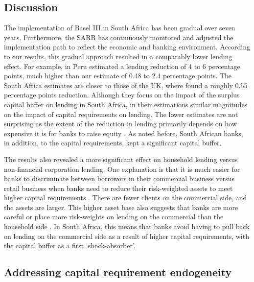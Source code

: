 \documentclass[
  12,
]{article}
\begin{document}
\hypertarget{discussion}{%
\subsection{Discussion}\label{discussion}}

The implementation of Basel III in South Africa has been gradual over seven years. Furthermore, the SARB has continuously monitored and adjusted the implementation path to reflect the economic and banking environment. According to our results, this gradual approach resulted in a comparably lower lending effect. For example, in Peru \citet{fang2020bank} estimated a lending reduction of 4 to 6 percentage points, much higher than our estimate of 0.48 to 2.4 percentage points. The South Africa estimates are closer to those of the UK, where \citet{aiyar2016does} found a roughly 0.55 percentage points reduction. Although they focus on the impact of the surplus capital buffer on lending in South Africa, in their estimations \citet{neryvia2023} similar magnitudes on the impact of capital requirements on lending. The lower estimates are not surprising as the extent of the reduction in lending primarily depends on how expensive it is for banks to raise equity \citep{aiyar2016does}. As noted before, South African banks, in addition, to the capital requirements, kept a significant capital buffer.

The results also revealed a more significant effect on household lending versus non-financial corporation lending. One explanation is that it is much easier for banks to discriminate between borrowers in their commercial business versus retail business when banks need to reduce their risk-weighted assets to meet higher capital requirements \citep{de2020bank}. There are fewer clients on the commercial side, and the assets are larger. This higher asset base also suggests that banks are more careful or place more risk-weights on lending on the commercial than the household side \citep{imbierowicz2018time}. In South Africa, this means that banks avoid having to pull back on lending on the commercial side as a result of higher capital requirements, with the capital buffer as a first `shock-absorber'.

\hypertarget{addressing-capital-requirement-endogeneity}{%
\subsection{Addressing capital requirement endogeneity}\label{addressing-capital-requirement-endogeneity}}
\end{document}
